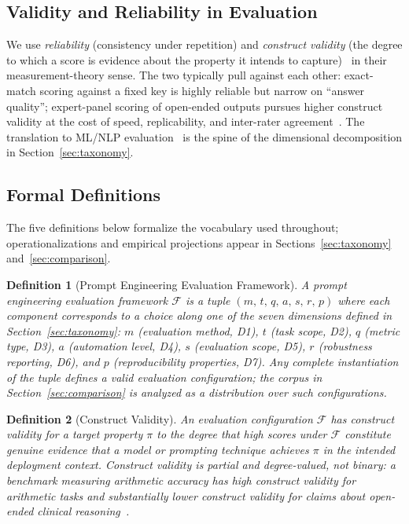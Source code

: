 \documentclass[acmsmall, nonacm, screen]{acmart}
\newtheorem{definition}{Definition}
\begin{document}
\subsection{Validity and Reliability in Evaluation}
\label{subsec:validityreliability}

We use \emph{reliability} (consistency under repetition) and
\emph{construct validity} (the degree to which a score is evidence
about the property it intends to
capture)~\cite{cronbach1955construct, messick1995validity} in their
measurement-theory sense. The two typically pull against each other:
exact-match scoring against a fixed key is highly reliable but
narrow on ``answer quality''; expert-panel scoring of open-ended
outputs pursues higher construct validity at the cost of speed,
replicability, and inter-rater agreement~\cite{chang2023survey}. The
translation to ML/NLP evaluation~\cite{jacobs2021measurement,
subramonian2023takeoneforteam, liao2023designing} is the spine of
the dimensional decomposition in Section~\ref{sec:taxonomy}.

\subsection{Formal Definitions}
\label{subsec:definitions}

The five definitions below formalize the vocabulary used throughout;
operationalizations and empirical projections appear in
Sections~\ref{sec:taxonomy} and~\ref{sec:comparison}.

\begin{definition}[Prompt Engineering Evaluation Framework]
A prompt engineering evaluation framework $\mathcal{F}$ is a tuple
$(m,\, t,\, q,\, a,\, s,\, r,\, p)$ where each component
corresponds to a choice along one of the seven dimensions defined
in Section~\ref{sec:taxonomy}: $m$ (evaluation method, D1), $t$
(task scope, D2), $q$ (metric type, D3), $a$ (automation level,
D4), $s$ (evaluation scope, D5), $r$ (robustness reporting, D6),
and $p$ (reproducibility properties, D7). Any complete instantiation
of the tuple defines a valid evaluation configuration; the corpus
in Section~\ref{sec:comparison} is analyzed as a distribution over
such configurations.
\end{definition}

\begin{definition}[Construct Validity]
An evaluation configuration $\mathcal{F}$ has construct validity for
a target property $\pi$ to the degree that high scores under
$\mathcal{F}$ constitute genuine evidence that a model or prompting
technique achieves $\pi$ in the intended deployment context.
Construct validity is partial and degree-valued, not binary: a
benchmark measuring arithmetic accuracy has high construct validity
for arithmetic tasks and substantially lower construct validity for
claims about open-ended clinical reasoning~\cite{cronbach1955construct,
messick1995validity, jacobs2021measurement}.
\end{definition}
\end{document}

